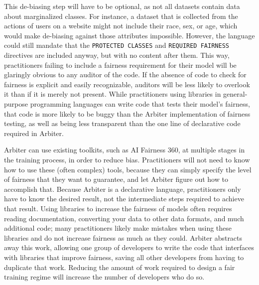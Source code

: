 \documentclass[sigconf]{acmart}
\begin{document}
This de-biasing step will have to be optional, as not all datasets contain data about marginalized classes. For instance, a dataset that is collected from the actions of users on a website might not include their race, sex, or age, which would make de-biasing against those attributes impossible. However, the language could still mandate that the \texttt{PROTECTED CLASSES} and \texttt{REQUIRED FAIRNESS} directives are included anyway, but with no content after them. This way, practitioners failing to include a fairness requirement for their model will be glaringly obvious to any auditor of the code. If the absence of code to check for fairness is explicit and easily recognizable, auditors will be less likely to overlook it than if it is merely not present. While practitioners using libraries in general-purpose programming languages can write code that tests their model's fairness, that code is more likely to be buggy than the Arbiter implementation of fairness testing, as well as being less transparent than the one line of declarative code required in Arbiter.

Arbiter can use existing toolkits, such as AI Fairness 360, at multiple stages in the training process, in order to reduce bias. Practitioners will not need to know how to use these (often complex) tools, because they can simply specify the level of fairness that they want to guarantee, and let Arbiter figure out how to accomplish that. Because Arbiter is a declarative language, practitioners only have to know the desired result, not the intermediate steps required to achieve that result. Using libraries to increase the fairness of models often requires reading documentation, converting your data to other data formats, and much additional code; many practitioners likely make mistakes when using these libraries and do not increase fairness as much as they could. Arbiter abstracts away this work, allowing one group of developers to write the code that interfaces with libraries that improve fairness, saving all other developers from having to duplicate that work. Reducing the amount of work required to design a fair training regime will increase the number of developers who do so.
\end{document}
